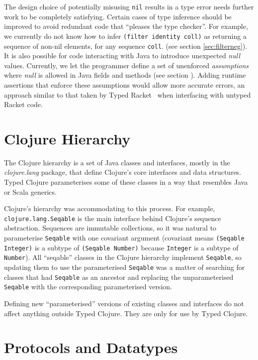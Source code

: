 The design choice of potentially misusing \lstinline|nil| results in a type error
needs further work to be completely satisfying.
Certain cases of type inference should be improved to avoid redundant code
that ``pleases the type checker''.
For example, we currently do not know how to infer \lstinline|(filter identity coll)|
as returning a sequence of non-nil elements, for any sequence \lstinline|coll|.
(see section \ref{sec:filterneg}).
It is also possible for code interacting with Java to introduce unexpected \emph{null}
values. Currently, we let the programmer define a set of unenforced \emph{assumptions}
where \emph{null} is allowed in Java fields and methods (see section \label{sec:javainterop}).
Adding runtime assertions that enforce these assumptions would allow more
accurate errors, an approach similar to that taken by Typed Racket~\cite{Tob10} when
interfacing with untyped Racket code.

\section{Clojure Hierarchy}

The Clojure hierarchy is a set of Java classes and interfaces, mostly in the
\emph{clojure.lang} package, that define Clojure's core 
interfaces and data structures.
Typed Clojure parameterises some of these classes in a way that resembles
Java or Scala generics.

Clojure's hierarchy was accommodating to this process.
For example, \lstinline{clojure.lang.Seqable} is the main interface behind
Clojure's sequence abstraction. Sequences are immutable collections,
so it was natural to parameterise \lstinline{Seqable} with one covariant
argument (covariant means \lstinline|(Seqable Integer)| is
a subtype of \lstinline|(Seqable Number)| because \lstinline|Integer|
is a subtype of \lstinline|Number|).
All ``seqable'' classes in the Clojure hierarchy implement \lstinline|Seqable|,
so updating them to use the parameterised \lstinline|Seqable| was a matter of
searching for classes that had \lstinline|Seqable| as an ancestor and replacing
the unparameterised \lstinline|Seqable| with the corresponding parameterised 
version.

Defining new ``parameterised'' versions of existing classes and interfaces do 
not affect anything outside Typed Clojure.
They are only for use by Typed Clojure.

\section{Protocols and Datatypes}

